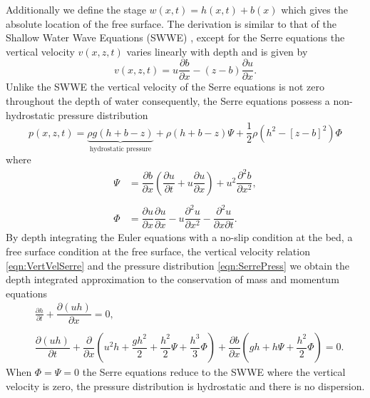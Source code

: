 Additionally we define the stage $w(x,t) = h(x,t) + b(x)$ which gives the absolute location of the free surface. The derivation is similar to that of the Shallow Water Wave Equations (SWWE) \cite{Liggett-1994}, except for the Serre equations the vertical velocity $v(x,z,t)$ varies linearly with depth and is given by \cite{Zoppou-2014}
\begin{equation}
v(x,z,t) = u \frac{\partial b}{\partial x} - (z - b) \frac{\partial u}{\partial x}.
\label{eqn:VertVelSerre}
\end{equation}
Unlike the SWWE the vertical velocity of the Serre equations is not zero throughout the depth of water consequently, the Serre equations possess a non-hydrostatic pressure distribution
\begin{equation}
\label{eqn:SerrePress}
 p(x,z,t) = \underbrace{ \rho g \left(h + b - z\right)}_{\text{hydrostatic pressure}} + \rho \left(h + b - z\right) \Psi + \frac{1}{2} \rho \left(h^2 - \left[z - b \right]^2\right) {\Phi }
\end{equation} 
where
\begin{subequations}
	\begin{align}
	{ \Psi }  &= \dfrac{\partial b}{\partial x}\left(\dfrac{\partial u}{\partial t} + u\dfrac{\partial u}{\partial x} \right)  + u^2\dfrac{\partial^2 b}{\partial x^2}, \label{eqn:SerreeqnPsi} 
	\\ \nonumber \\
	{ \Phi }  &= \dfrac{\partial u }{\partial x} \dfrac{\partial u}{\partial x} -u \dfrac{\partial^2 u}{\partial x^2}  - \dfrac{\partial^2 u}{\partial x \partial t} . \label{eqn:SerreeqnPhi} 
	\end{align}
	\label{eqn:FullSerreNonConVarDef}
\end{subequations}
By depth integrating the Euler equations \cite{Su-Gardener-1969-536,Zoppou-2014} with a no-slip condition at the bed, a free surface condition at the free surface, the vertical velocity relation \eqref{eqn:VertVelSerre} and the pressure distribution \eqref{eqn:SerrePress} we obtain the depth integrated approximation to the conservation of mass and momentum equations
\begin{subequations}
	\begin{align}
	&\frac{\partial h}{\partial t} + \dfrac{\partial (uh)}{\partial x} = 0,  \label{eqn:FullSerreNonConMass} \\ \nonumber \\
	&\dfrac{\partial (uh)}{\partial t} + \dfrac{\partial}{\partial x} \left ( u^2h + \dfrac{gh^2}{2} + \dfrac{h^2}{2}{\Psi} + \dfrac{h^3}{3}{ \Phi }  \right )  +  \dfrac{\partial b}{\partial x} \left (gh +   h \Psi + \dfrac{h^2}{2}{ \Phi }  \right ) = 0.	\label{eqn:FullSerreNonConMome}
	\end{align}
	\label{eqn:FullSerreNonCon}
\end{subequations}
When $\Phi = \Psi = 0$ the Serre equations reduce to the SWWE where the vertical velocity is zero, the pressure distribution is hydrostatic and there is no dispersion. 


